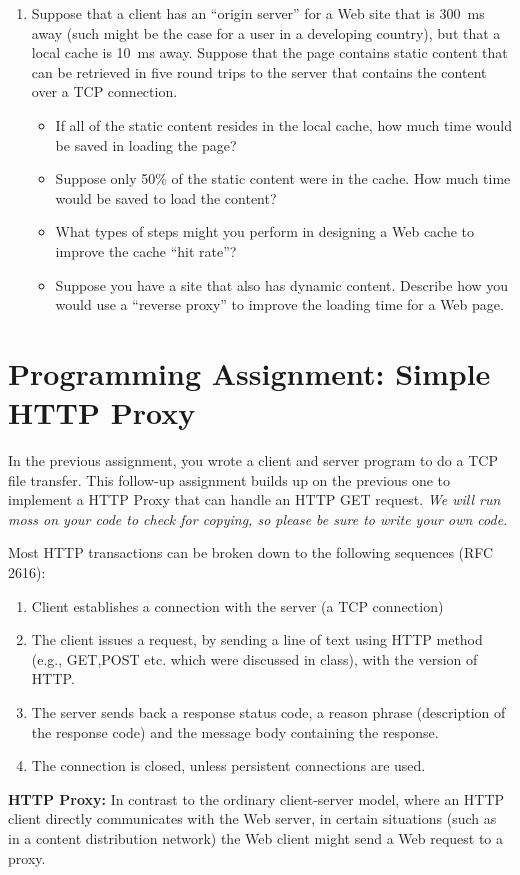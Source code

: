 \documentclass[11pt]{article}
\begin{document}
\begin{enumerate}
\item Suppose that a client has an ``origin server'' for a Web site that
  is 300~ms away (such might be the case for a user in a developing
  country), but that a local cache is 10~ms away.  Suppose that the page
  contains static content that can be retrieved in five round trips to
  the server that contains the content over a TCP connection.
\begin{itemize}
\item If all of the static content resides in the local cache, how much
  time would be saved in loading the page?
\item Suppose only 50\% of the static content were in the cache.  How
  much time would be saved to load the content?
\item What types of steps might you perform in designing a Web cache to
  improve the cache ``hit rate''?
\item Suppose you have a site that also has dynamic content.  Describe
  how you would use a ``reverse proxy'' to improve the loading time for
  a Web page.
\end{itemize}
\end{enumerate}




\section{Programming Assignment: Simple HTTP Proxy}

In the previous assignment, you wrote a client and server program to do
a TCP file transfer.  This follow-up assignment builds up on the
previous one to implement a HTTP Proxy that can handle an HTTP GET
request. {\em We will run moss on your code to check for copying, so
  please be sure to write your own code.}

Most HTTP transactions can be broken down to the following sequences
(RFC 2616): 
\begin{enumerate}
\item Client establishes a connection with the server (a TCP connection)
\item The client issues a request, by sending a line of text using HTTP
  method (e.g., GET,POST etc. which were discussed in class), with the
  version of HTTP.
\item The server sends back a response status code, a reason
phrase (description of the response code) and the message body
containing the response.
\item The connection is closed, unless persistent connections are used.
\end{enumerate}
\noindent
{\bf HTTP Proxy:} In contrast to the ordinary client-server model, where
an HTTP client directly communicates with the Web server, in certain
situations (such as in a content distribution network) the Web client
might send a Web request to a proxy.
\end{document}
